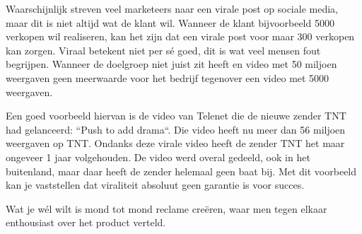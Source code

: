 Waarschijnlijk streven veel marketeers naar een virale post op sociale media, maar dit is niet altijd wat de klant wil. Wanneer de klant bijvoorbeeld 5000 verkopen wil realiseren, kan het zijn dat een virale post voor maar 300 verkopen kan zorgen. Viraal betekent niet per sé goed, dit is wat veel mensen fout begrijpen. Wanneer de doelgroep niet juist zit heeft en video met 50 miljoen weergaven geen meerwaarde voor het bedrijf tegenover een video met 5000 weergaven.

Een goed voorbeeld hiervan is de video van Telenet die de nieuwe zender TNT had gelanceerd: ``Push to add drama``. Die video heeft nu meer dan 56 miljoen weergaven op TNT. Ondanks deze virale video heeft de zender TNT het maar ongeveer 1 jaar volgehouden. De video werd overal gedeeld, ook in het buitenland, maar daar heeft de zender helemaal geen baat bij. Met dit voorbeeld kan je vaststellen dat viraliteit absoluut geen garantie is voor succes.

Wat je wél wilt is mond tot mond reclame creëren, waar men tegen elkaar enthousiast over het product verteld.

